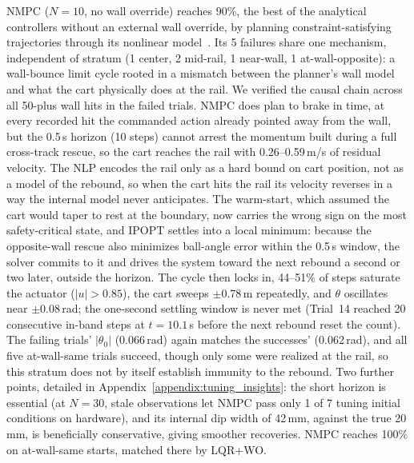 NMPC ($N{=}10$, no wall override) reaches 90\%, the best of the analytical
controllers without an external wall override, by planning
constraint-satisfying trajectories through its
nonlinear model~\cite{mayne2014mpc}. Its 5 failures share one mechanism,
independent of stratum (1 center, 2 mid-rail, 1 near-wall, 1
at-wall-opposite): a wall-bounce limit cycle rooted in a mismatch between the
planner's wall model and what the cart physically does at the rail. We
verified the causal chain across all 50-plus wall hits in the failed trials.
NMPC does plan to brake in time, at every recorded hit the commanded action
already pointed away from the wall, but the 0.5\,s horizon (10 steps) cannot
arrest the momentum built during a full cross-track rescue, so the cart
reaches the rail with 0.26--0.59\,m/s of residual velocity. The NLP encodes
the rail only as a hard bound on cart position, not as a model of the rebound,
so when the cart hits the rail its velocity reverses in a way the internal
model never anticipates. The warm-start, which assumed the cart would taper to
rest at the boundary, now carries the wrong sign on the most safety-critical
state, and IPOPT settles into a local minimum: because the opposite-wall
rescue also minimizes ball-angle error within the 0.5\,s window, the solver
commits to it and drives the system toward the next rebound a second or two
later, outside the horizon. The cycle then locks in, 44--51\% of steps
saturate the actuator ($|u|{>}0.85$), the cart sweeps $\pm$0.78\,m repeatedly,
and $\theta$ oscillates near $\pm$0.08\,rad; the one-second settling window is
never met (Trial~14 reached 20 consecutive in-band steps at $t{=}10.1$\,s
before the next rebound reset the count). The failing trials' $|\theta_0|$
(0.066\,rad) again matches the successes' (0.062\,rad), and all five
at-wall-same trials succeed, though only some were realized at the rail, so
this stratum does not by itself establish immunity to the rebound. Two further points, detailed
in Appendix~\ref{appendix:tuning_insights}: the short horizon is essential (at
$N{=}30$, stale observations let NMPC pass only 1 of 7 tuning initial
conditions on hardware), and its internal dip width of
42\,mm, against the true 20\,mm, is beneficially conservative, giving smoother
recoveries. NMPC reaches 100\% on at-wall-same starts, matched there by LQR+WO.

